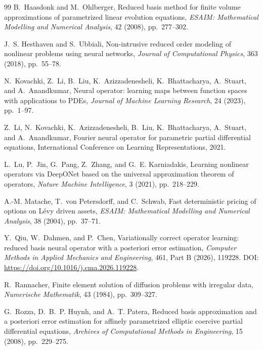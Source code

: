 \documentclass[11pt]{amsart}
\theoremstyle{remark}
\begin{document}
\begin{thebibliography}{99}
B.~Haasdonk and M.~Ohlberger,
\newblock Reduced basis method for finite volume approximations of
parametrized linear evolution equations,
\newblock \emph{ESAIM: Mathematical Modelling and Numerical Analysis},
42 (2008), pp.~277--302.

J.~S. Hesthaven and S.~Ubbiali,
\newblock Non-intrusive reduced order modeling of nonlinear problems using
neural networks,
\newblock \emph{Journal of Computational Physics}, 363 (2018), pp.~55--78.

N.~Kovachki, Z.~Li, B.~Liu, K.~Azizzadenesheli, K.~Bhattacharya, A.~Stuart,
and A.~Anandkumar,
\newblock Neural operator: learning maps between function spaces with
applications to PDEs,
\newblock \emph{Journal of Machine Learning Research}, 24 (2023), pp.~1--97.

Z.~Li, N.~Kovachki, K.~Azizzadenesheli, B.~Liu, K.~Bhattacharya, A.~Stuart,
and A.~Anandkumar,
\newblock Fourier neural operator for parametric partial differential
equations,
\newblock International Conference on Learning Representations, 2021.

L.~Lu, P.~Jin, G.~Pang, Z.~Zhang, and G.~E. Karniadakis,
\newblock Learning nonlinear operators via DeepONet based on the universal
approximation theorem of operators,
\newblock \emph{Nature Machine Intelligence}, 3 (2021), pp.~218--229.

A.-M. Matache, T.~von Petersdorff, and C.~Schwab,
\newblock Fast deterministic pricing of options on L\'evy driven assets,
\newblock \emph{ESAIM: Mathematical Modelling and Numerical Analysis},
38 (2004), pp.~37--71.

Y.~Qiu, W.~Dahmen, and P.~Chen,
\newblock Variationally correct operator learning: reduced basis neural
operator with a posteriori error estimation,
\newblock \emph{Computer Methods in Applied Mechanics and Engineering},
461, Part B (2026), 119228.
DOI: \url{https://doi.org/10.1016/j.cma.2026.119228}.

R.~Rannacher,
\newblock Finite element solution of diffusion problems with irregular data,
\newblock \emph{Numerische Mathematik}, 43 (1984), pp.~309--327.

G.~Rozza, D.~B.~P. Huynh, and A.~T. Patera,
\newblock Reduced basis approximation and a posteriori error estimation for
affinely parametrized elliptic coercive partial differential equations,
\newblock \emph{Archives of Computational Methods in Engineering},
15 (2008), pp.~229--275.


\end{thebibliography}
\end{document}
